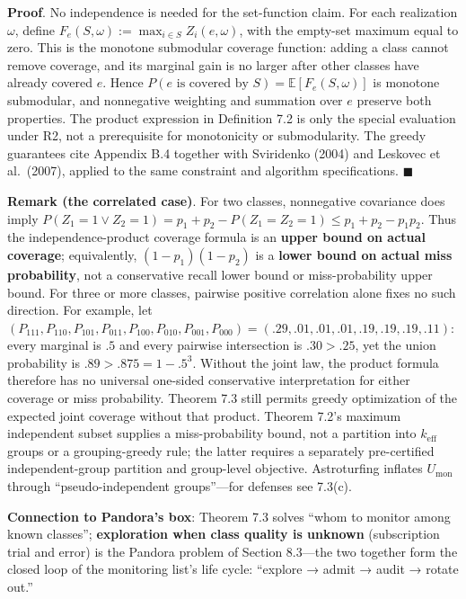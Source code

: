 \documentclass[
  11pt]{article}
\begin{document}
\textbf{Proof}. No independence is needed for the set-function claim.
For each realization \(\omega\), define
\(F_e(S,\omega):=\max_{i\in S}Z_i(e,\omega)\), with the empty-set
maximum equal to zero. This is the monotone submodular coverage
function: adding a class cannot remove coverage, and its marginal gain
is no larger after other classes have already covered \(e\). Hence
\(P(e\text{ is covered by }S)=\mathbb E[F_e(S,\omega)]\) is monotone
submodular, and nonnegative weighting and summation over \(e\) preserve
both properties. The product expression in Definition 7.2 is only the
special evaluation under R2, not a prerequisite for monotonicity or
submodularity. The greedy guarantees cite Appendix B.4 together with
Sviridenko (2004) and Leskovec et al.~(2007), applied to the same
constraint and algorithm specifications. \(\blacksquare\)

\textbf{Remark (the correlated case)}. For two classes, nonnegative
covariance does imply
\(P(Z_1=1\lor Z_2=1)=p_1+p_2-P(Z_1=Z_2=1)\le p_1+p_2-p_1p_2\). Thus the
independence-product coverage formula is an \textbf{upper bound on
actual coverage}; equivalently, \((1-p_1)(1-p_2)\) is a \textbf{lower
bound on actual miss probability}, not a conservative recall lower bound
or miss-probability upper bound. For three or more classes, pairwise
positive correlation alone fixes no such direction. For example, let
\((P_{111},P_{110},P_{101},P_{011},P_{100},P_{010},P_{001},P_{000})=(.29,.01,.01,.01,.19,.19,.19,.11)\):
every marginal is \(.5\) and every pairwise intersection is \(.30>.25\),
yet the union probability is \(.89>.875=1-.5^3\). Without the joint law,
the product formula therefore has no universal one-sided conservative
interpretation for either coverage or miss probability. Theorem 7.3
still permits greedy optimization of the expected joint coverage without
that product. Theorem 7.2's maximum independent subset supplies a
miss-probability bound, not a partition into \(k_{\mathrm{eff}}\) groups
or a grouping-greedy rule; the latter requires a separately
pre-certified independent-group partition and group-level objective.
Astroturfing inflates \(U_{\mathrm{mon}}\) through ``pseudo-independent
groups''---for defenses see 7.3(c).

\textbf{Connection to Pandora's box}: Theorem 7.3 solves ``whom to
monitor among known classes''; \textbf{exploration when class quality is
unknown} (subscription trial and error) is the Pandora problem of
Section 8.3---the two together form the closed loop of the monitoring
list's life cycle: ``explore → admit → audit → rotate out.''
\end{document}
